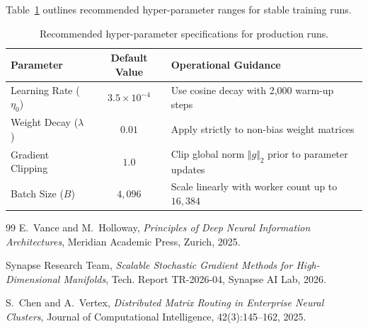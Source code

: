\documentclass[
  11pt,
  a4paper,
  twoside=true,
  headsepline=0.8pt,
  footsepline=false,
  open=right,
  numbers=noenddot,
  chapterprefix=false,
  BCOR=6mm
]{scrbook}
\begin{document}
Table~\ref{tab:guidelines} outlines recommended hyper-parameter ranges for stable training runs.

\begin{table}[htbp]
  \centering
  \caption{Recommended hyper-parameter specifications for production runs.}
  \label{tab:guidelines}
  \vspace{4pt}
  \begin{tabularx}{\textwidth}{l c X}
    \toprule
    \textbf{Parameter} & \textbf{Default Value} & \textbf{Operational Guidance} \\
    \midrule
    Learning Rate ($\eta_0$) & $3.5 \times 10^{-4}$ & Use cosine decay with 2,000 warm-up steps \\
    Weight Decay ($\lambda$) & $0.01$ & Apply strictly to non-bias weight matrices \\
    Gradient Clipping & $1.0$ & Clip global norm $\Vert g \Vert_2$ prior to parameter updates \\
    Batch Size ($B$) & $4,096$ & Scale linearly with worker count up to $16,384$ \\
    \bottomrule
  \end{tabularx}
\end{table}

\backmatter

\begin{thebibliography}{99}
E.~Vance and M.~Holloway, \emph{Principles of Deep Neural Information Architectures}, Meridian Academic Press, Zurich, 2025.

Synapse Research Team, \emph{Scalable Stochastic Gradient Methods for High-Dimensional Manifolds}, Tech. Report TR-2026-04, Synapse AI Lab, 2026.

S.~Chen and A.~Vertex, \emph{Distributed Matrix Routing in Enterprise Neural Clusters}, Journal of Computational Intelligence, 42(3):145--162, 2025.
\end{thebibliography}
\end{document}

